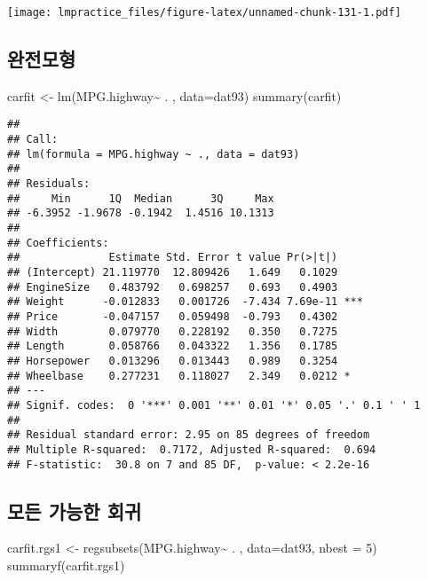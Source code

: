 \documentclass[
]{book}
\newenvironment{Shaded}{\begin{snugshade}}{\end{snugshade}}
\newcommand{\AttributeTok}[1]{\textcolor[rgb]{0.77,0.63,0.00}{#1}}
\newcommand{\DecValTok}[1]{\textcolor[rgb]{0.00,0.00,0.81}{#1}}
\newcommand{\FunctionTok}[1]{\textcolor[rgb]{0.00,0.00,0.00}{#1}}
\newcommand{\NormalTok}[1]{#1}
\newcommand{\OtherTok}[1]{\textcolor[rgb]{0.56,0.35,0.01}{#1}}
\newcommand{\SpecialCharTok}[1]{\textcolor[rgb]{0.00,0.00,0.00}{#1}}
\begin{document}
\texttt{[image: lmpractice\_files/figure-latex/unnamed-chunk-131-1.pdf]}

\hypertarget{uxc644uxc804uxbaa8uxd615}{%
\subsection{완전모형}\label{uxc644uxc804uxbaa8uxd615}}

\begin{Shaded}
\begin{Highlighting}[]
\NormalTok{carfit }\OtherTok{\textless{}{-}} \FunctionTok{lm}\NormalTok{(MPG.highway}\SpecialCharTok{\textasciitilde{}}\NormalTok{ . , }\AttributeTok{data=}\NormalTok{dat93)}
\FunctionTok{summary}\NormalTok{(carfit)}
\end{Highlighting}
\end{Shaded}

\begin{verbatim}
## 
## Call:
## lm(formula = MPG.highway ~ ., data = dat93)
## 
## Residuals:
##     Min      1Q  Median      3Q     Max 
## -6.3952 -1.9678 -0.1942  1.4516 10.1313 
## 
## Coefficients:
##              Estimate Std. Error t value Pr(>|t|)    
## (Intercept) 21.119770  12.809426   1.649   0.1029    
## EngineSize   0.483792   0.698257   0.693   0.4903    
## Weight      -0.012833   0.001726  -7.434 7.69e-11 ***
## Price       -0.047157   0.059498  -0.793   0.4302    
## Width        0.079770   0.228192   0.350   0.7275    
## Length       0.058766   0.043322   1.356   0.1785    
## Horsepower   0.013296   0.013443   0.989   0.3254    
## Wheelbase    0.277231   0.118027   2.349   0.0212 *  
## ---
## Signif. codes:  0 '***' 0.001 '**' 0.01 '*' 0.05 '.' 0.1 ' ' 1
## 
## Residual standard error: 2.95 on 85 degrees of freedom
## Multiple R-squared:  0.7172, Adjusted R-squared:  0.694 
## F-statistic:  30.8 on 7 and 85 DF,  p-value: < 2.2e-16
\end{verbatim}

\hypertarget{uxbaa8uxb4e0-uxac00uxb2a5uxd55c-uxd68cuxadc0}{%
\subsection{모든 가능한 회귀}\label{uxbaa8uxb4e0-uxac00uxb2a5uxd55c-uxd68cuxadc0}}

\begin{Shaded}
\begin{Highlighting}[]
\NormalTok{carfit.rgs1 }\OtherTok{\textless{}{-}} \FunctionTok{regsubsets}\NormalTok{(MPG.highway}\SpecialCharTok{\textasciitilde{}}\NormalTok{ . , }\AttributeTok{data=}\NormalTok{dat93, }\AttributeTok{nbest =} \DecValTok{5}\NormalTok{)}
\FunctionTok{summaryf}\NormalTok{(carfit.rgs1)}
\end{Highlighting}
\end{Shaded}
\end{document}
